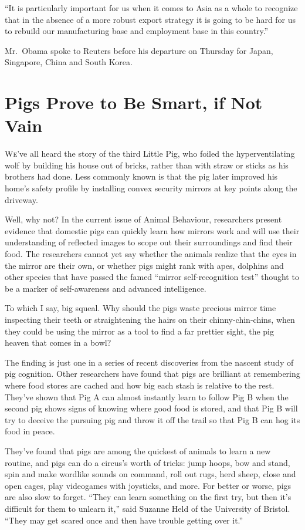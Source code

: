﻿\documentclass[12pt]{article}
\begin{document}
``It is particularly important for us when it comes to Asia as a whole to recognize that in the
absence of a more robust export strategy it is going to be hard for us to rebuild our manufacturing
base and employment base in this country.''

Mr.~Obama spoke to Reuters before his departure on Thursday for Japan, Singapore, China and South
Korea.

\section{Pigs Prove to Be Smart, if Not Vain}

\lettrine{W}{e}'ve all heard the story of the third Little Pig, who foiled
the hyperventilating wolf by building his house out of bricks, rather than with straw or sticks as
his brothers had done. Less commonly known is that the pig later improved his home's safety profile
by installing convex security mirrors at key points along the driveway.

Well, why not? In the current issue of Animal Behaviour, researchers present evidence that domestic
pigs can quickly learn how mirrors work and will use their understanding of reflected images to
scope out their surroundings and find their food. The researchers cannot yet say whether the animals
realize that the eyes in the mirror are their own, or whether pigs might rank with apes, dolphins
and other species that have passed the famed ``mirror self-recognition test'' thought to be a marker
of self-awareness and advanced intelligence.

To which I say, big squeal. Why should the pigs waste precious mirror time inspecting their teeth or
straightening the hairs on their chinny-chin-chins, when they could be using the mirror as a tool to
find a far prettier sight, the pig heaven that comes in a bowl?

The finding is just one in a series of recent discoveries from the nascent study of pig cognition.
Other researchers have found that pigs are brilliant at remembering where food stores are cached and
how big each stash is relative to the rest. They've shown that Pig A can almost instantly learn to
follow Pig B when the second pig shows signs of knowing where good food is stored, and that Pig B
will try to deceive the pursuing pig and throw it off the trail so that Pig B can hog its food in
peace.

They've found that pigs are among the quickest of animals to learn a new routine, and pigs can do a
circus's worth of tricks: jump hoops, bow and stand, spin and make wordlike sounds on command, roll
out rugs, herd sheep, close and open cages, play videogames with joysticks, and more. For better or
worse, pigs are also slow to forget. ``They can learn something on the first try, but then it's
difficult for them to unlearn it,'' said Suzanne Held of the University of Bristol. ``They may get
scared once and then have trouble getting over it.''
\end{document}
